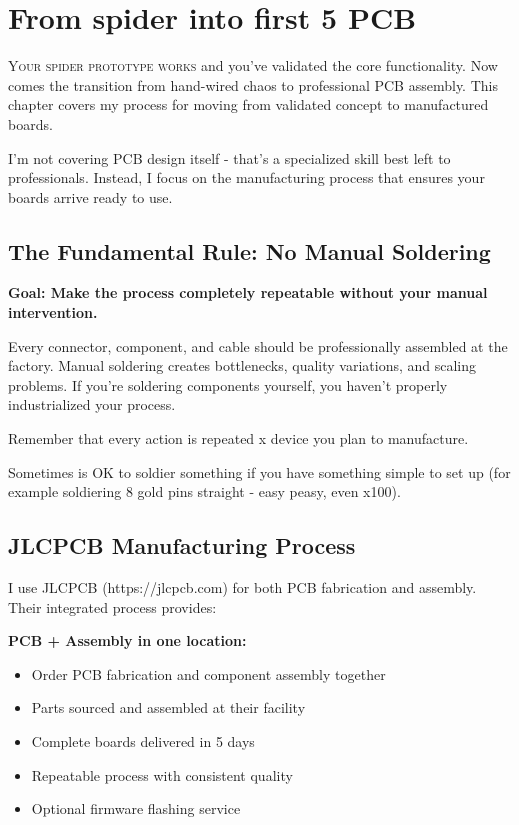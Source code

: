 \chapter{From spider into first 5 PCB}

\lettrine{Y}{our spider prototype works} and you've validated the core functionality. Now comes the transition from hand-wired chaos to professional PCB assembly. This chapter covers my process for moving from validated concept to manufactured boards.

I'm not covering PCB design itself - that's a specialized skill best left to professionals. Instead, I focus on the manufacturing process that ensures your boards arrive ready to use.

\section{The Fundamental Rule: No Manual Soldering}

\textbf{Goal: Make the process completely repeatable without your manual intervention.}

Every connector, component, and cable should be professionally assembled at the factory. Manual soldering creates bottlenecks, quality variations, and scaling problems. If you're soldering components yourself, you haven't properly industrialized your process.

Remember that every action is repeated x device you plan to manufacture. 

Sometimes is OK to soldier something if you have something simple to set up (for example soldiering 8 gold pins straight - easy peasy, even x100).

\section{JLCPCB Manufacturing Process}

I use JLCPCB (https://jlcpcb.com) for both PCB fabrication and assembly. Their integrated process provides:

\textbf{PCB + Assembly in one location:}
\begin{itemize}
\item Order PCB fabrication and component assembly together
\item Parts sourced and assembled at their facility
\item Complete boards delivered in 5 days
\item Repeatable process with consistent quality
\item Optional firmware flashing service
\end{itemize}

